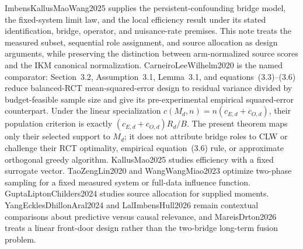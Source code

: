 ImbensKallusMaoWang2025 supplies the persistent-confounding bridge model, the fixed-system limit law, and the local efficiency result under its stated identification, bridge, operator, and nuisance-rate premises. This note treats the measured subset, sequential role assignment, and source allocation as design arguments, while preserving the distinction between arm-normalized source scores and the IKM canonical normalization. CarneiroLeeWilhelm2020 is the named comparator: Section~3.2, Assumption~3.1, Lemma~3.1, and equations~(3.3)--(3.6) reduce balanced-RCT mean-squared-error design to residual variance divided by budget-feasible sample size and give its pre-experimental empirical squared-error counterpart. Under the linear specialization \(c(M_d,n)=n(c_{E,d}+c_{O,d})\), their population criterion is exactly \((c_{E,d}+c_{O,d})R_d/B\). The present theorem maps only their selected support to \(M_d\); it does not attribute bridge roles to CLW or challenge their RCT optimality, empirical equation~(3.6) rule, or approximate orthogonal greedy algorithm. KallusMao2025 studies efficiency with a fixed surrogate vector. TaoZengLin2020 and WangWangMiao2023 optimize two-phase sampling for a fixed measured system or full-data influence function. GuptaLiptonChilders2024 studies source allocation for supplied moments. YangEcklesDhillonAral2024 and LalImbensHull2026 remain contextual comparisons about predictive versus causal relevance, and MareisDrton2026 treats a linear front-door design rather than the two-bridge long-term fusion problem.